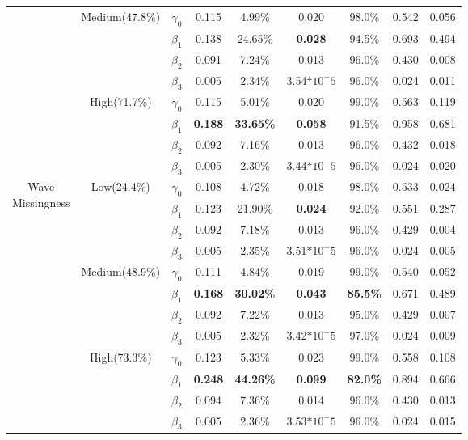 \documentclass{svjour3}\usepackage[]{graphicx}\usepackage[]{color}
\begin{document}
\begin{table}[p]
\begin{tabular}{c|c|c|cccccc}
		&\multirow{4}{*}{Medium(47.8\%)}
		& $\gamma_0$ & 0.115 & 4.99\% & 0.020 & 98.0\% & 0.542 & 0.056 \\
		&& $\beta_1$ & 0.138 & 24.65\% & \textbf{0.028} & 94.5\% & 0.693 & 0.494 \\
		&& $\beta_2$ & 0.091 & 7.24\% & 0.013 & 96.0\% & 0.430 & 0.008 \\
		&& $\beta_3$ & 0.005 & 2.34\% & 3.54$*10^-5$ & 96.0\% & 0.024 & 0.011 \\ \cline{2-9} \noalign{\smallskip}
		& \multirow{4}{*}{High(71.7\%)}
		& $\gamma_0$ & 0.115 & 5.01\% & 0.020 & 99.0\% & 0.563 & 0.119 \\
		&& $\beta_1$ & \textbf{0.188} & \textbf{33.65\%} & \textbf{0.058} & 91.5\% & 0.958 & 0.681 \\
		&& $\beta_2$ & 0.092 & 7.16\% & 0.013 & 96.0\% & 0.432 & 0.018 \\
		&& $\beta_3$ & 0.005 & 2.30\% & 3.44$*10^-5$ & 96.0\% & 0.024 & 0.020 \\
		\midrule
		\midrule
		\multirow{12}{*}{\parbox{1.75cm}{Wave \\ Missingness}}
		& \multirow{4}{*}{Low(24.4\%)}
		& $\gamma_0$ & 0.108 & 4.72\% & 0.018 & 98.0\% & 0.533 & 0.024 \\
		&& $\beta_1$ & 0.123 & 21.90\% & \textbf{0.024} & 92.0\% & 0.551 & 0.287 \\
		&& $\beta_2$ & 0.092 & 7.18\% & 0.013 & 96.0\% & 0.429 & 0.004 \\
		&& $\beta_3$ & 0.005 & 2.35\% & 3.51$*10^-5$ & 96.0\% & 0.024 & 0.005 \\ \cline{2-9} \noalign{\smallskip}
		&\multirow{4}{*}{Medium(48.9\%)}
		& $\gamma_0$ & 0.111 & 4.84\% & 0.019 & 99.0\% & 0.540 & 0.052 \\
		&& $\beta_1$ & \textbf{0.168} & \textbf{30.02\%} & \textbf{0.043} & \textbf{85.5\%} & 0.671 & 0.489 \\
		&& $\beta_2$ & 0.092 & 7.22\% & 0.013 & 95.0\% & 0.429 & 0.007 \\
		&& $\beta_3$ & 0.005 & 2.32\% & 3.42$*10^-5$ & 97.0\% & 0.024 & 0.009 \\ \cline{2-9} \noalign{\smallskip}
		& \multirow{4}{*}{High(73.3\%)}
		& $\gamma_0$ & 0.123 & 5.33\% & 0.023 & 99.0\% & 0.558 & 0.108 \\
		&& $\beta_1$ & \textbf{0.248} & \textbf{44.26\%} & \textbf{0.099} & \textbf{82.0\%} & 0.894 & 0.666 \\
		&& $\beta_2$ & 0.094 & 7.36\% & 0.014 & 96.0\% & 0.430 & 0.013 \\
		&& $\beta_3$ & 0.005 & 2.36\% & 3.53$*10^-5$ & 96.0\% & 0.024 & 0.015 \\
		\bottomrule
	\end{tabular}	
\end{table}
\end{document}
